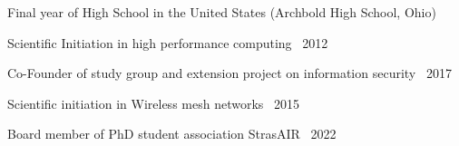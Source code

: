 
Final year of High School in the United States (Archbold High School, Ohio)	\dotfill {}

Scientific Initiation in high performance computing	\dotfill {} \textemdash\ 2012

Co-Founder of study group and extension project on information security \dotfill {} \textemdash\ 2017

Scientific initiation in Wireless mesh networks \dotfill {} \textemdash\ 2015

Board member of PhD student association StrasAIR \dotfill {} \textemdash\ 2022
